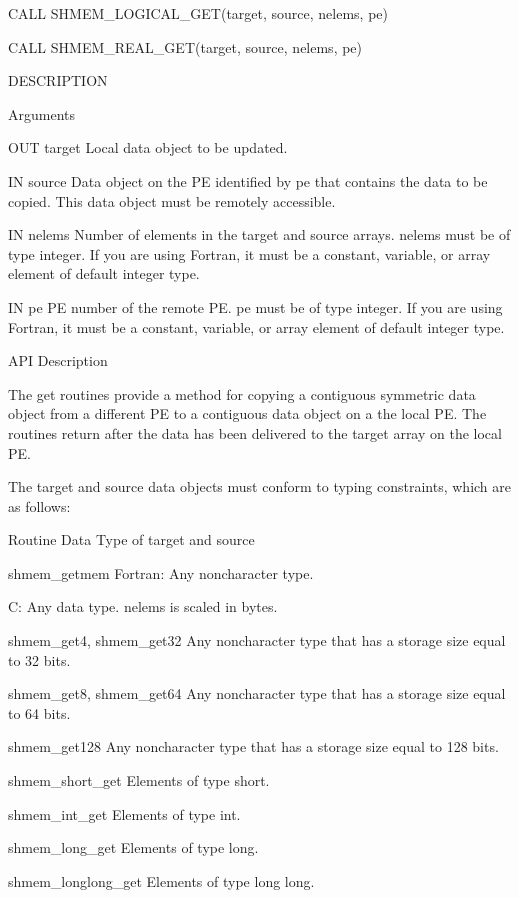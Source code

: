 	  CALL SHMEM_LOGICAL_GET(target, source, nelems, pe)

	  CALL SHMEM_REAL_GET(target, source, nelems, pe)

DESCRIPTION

Arguments

	OUT       target	 Local data object to be updated.

       IN	source	 Data object on the PE identified by pe that contains the data
		 to  be copied.	 This data object must be remotely accessible.

       IN	nelems	 Number of elements in the target and source arrays.  nelems must
		 be  of	 type integer.	If you are using Fortran, it must be a
		 constant, variable, or array element of default integer type.

       IN	pe	 PE  number of the remote PE.  pe must be of type integer.  If
		 you are using Fortran, it must be a  constant,	 variable,  or
		 array element of default integer type.

API Description

       The  get	 routines  provide  a  method	 for copying a
       contiguous symmetric data object from a different PE to a contiguous data	object
       on  a  the  local  PE.	The  routines  return  after the data has been
       delivered to the target array on the local PE.

       The  target and source data objects must conform to typing constraints,
       which are as follows:

       Routine			     Data Type of target and source

       shmem_getmem		     Fortran:  Any noncharacter type.

				     C:	 Any  data  type.  nelems	is  scaled  in
				     bytes.

       shmem_get4, shmem_get32	     Any  noncharacter type that has a storage
				     size equal to 32 bits.

       shmem_get8, shmem_get64	     Any noncharacter type that has a  storage
				     size equal to 64 bits.

       shmem_get128		     Any  noncharacter type that has a storage
				     size equal to 128 bits.

       shmem_short_get		     Elements of type short.

       shmem_int_get		     Elements of type int.

       shmem_long_get		     Elements of type long.

       shmem_longlong_get	     Elements of type long long.


